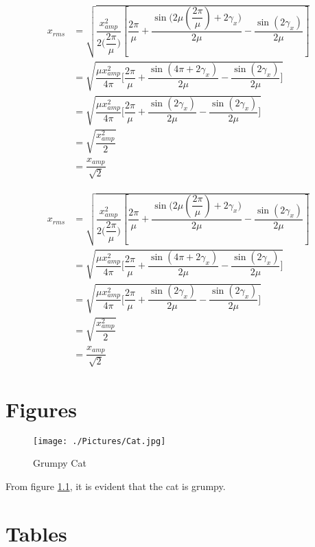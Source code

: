 \documentclass[]{report}
\begin{document}
\begin{align}
{x_{rms}}&=\sqrt{\dfrac{x_{amp}^2}{2\Biggl(\dfrac{2\pi}{\mu}\Biggr)}\left[ \dfrac{2\pi}{\mu}+\dfrac{\sin{\Biggl(2\mu\left(\dfrac{2\pi}{\mu}\right)+2\gamma_x\Biggr)}}{2\mu}-\dfrac{\sin{(2\gamma_x)}}{2\mu} \right]} \\
&=\sqrt{\dfrac{\mu x_{amp}^2}{4\pi}\Biggl[ \dfrac{2\pi}{\mu}+\dfrac{\sin{(4\pi +2\gamma_x)}}{2\mu}-\dfrac{\sin{(2\gamma_x)}}{2\mu} \Biggr]} \\
&=\sqrt{\dfrac{\mu x_{amp}^2}{4\pi}\Biggl[ \dfrac{2\pi}{\mu}+\dfrac{\sin{(2\gamma_x)}}{2\mu}-\dfrac{\sin{(2\gamma_x)}}{2\mu} \Biggr]} \\
&=\sqrt{\dfrac{x_{amp}^2}{2}} \\
&=\dfrac{x_{amp}}{\sqrt{2}}
\end{align}

\begin{align*}
{x_{rms}}&=\sqrt{\dfrac{x_{amp}^2}{2\Biggl(\dfrac{2\pi}{\mu}\Biggr)}\left[ \dfrac{2\pi}{\mu}+\dfrac{\sin{\Biggl(2\mu\left(\dfrac{2\pi}{\mu}\right)+2\gamma_x\Biggr)}}{2\mu}-\dfrac{\sin{(2\gamma_x)}}{2\mu} \right]} \\
&=\sqrt{\dfrac{\mu x_{amp}^2}{4\pi}\Biggl[ \dfrac{2\pi}{\mu}+\dfrac{\sin{(4\pi +2\gamma_x)}}{2\mu}-\dfrac{\sin{(2\gamma_x)}}{2\mu} \Biggr]} \\
&=\sqrt{\dfrac{\mu x_{amp}^2}{4\pi}\Biggl[ \dfrac{2\pi}{\mu}+\dfrac{\sin{(2\gamma_x)}}{2\mu}-\dfrac{\sin{(2\gamma_x)}}{2\mu} \Biggr]} \\
&=\sqrt{\dfrac{x_{amp}^2}{2}} \\
&=\dfrac{x_{amp}}{\sqrt{2}}
\end{align*}

\chapter{Figures}

\begin{figure}[!ht]
\centering
\texttt{[image: ./Pictures/Cat.jpg]}
\caption{Grumpy Cat}
\label{fig:Grumpy Cat}
\end{figure}

From figure \ref{fig:Grumpy Cat}, it is evident that the cat is grumpy.

\chapter{Tables}
\end{document}

